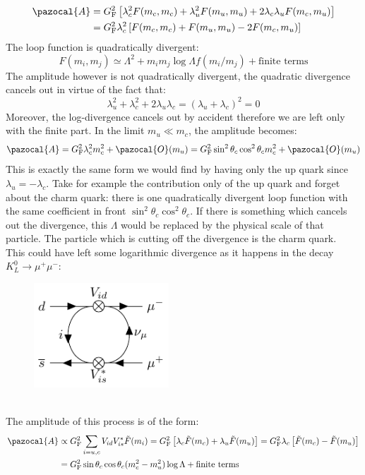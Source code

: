 \documentclass[../main.tex]{subfiles}
\begin{document}
\begin{align*}
\pazocal{A}&=G_{\text{F}}^2\left[\lambda_c^2F(m_c,m_c)+\lambda_u^2F(m_u,m_u)+2\lambda_c\lambda_uF(m_c,m_u)\right]\\
&=G_{\text{F}}^2\lambda_c^2\left[F(m_c,m_c)+F(m_u,m_u)-2F(m_c,m_u)\right]
\end{align*}
The loop function is quadratically divergent:
\[
F(m_i,m_j)\simeq\Lambda^2+m_im_j\log\Lambda f(m_i/m_j)+\text{finite terms}
\]
The amplitude however is not quadratically divergent, the quadratic divergence cancels out in virtue of the fact that:
\[
\lambda_u^2+\lambda_c^2+2\lambda_u\lambda_c=(\lambda_u+\lambda_c)^2=0
\]
Moreover, the log-divergence cancels out by accident therefore we are left only with the finite part. In the limit $m_u\ll m_c$, the amplitude becomes:
\[
\pazocal{A}=G_{\text{F}}^2\lambda_c^2m_c^2+\pazocal{O}(m_u)=G_{\text{F}}^2\sin^2\theta_c\cos^2\theta_cm_c^2+\pazocal{O}(m_u)
\]
This is exactly the same form we would find by having only the up quark since $\lambda_u=-\lambda_c$. Take for example the contribution  only of the up quark and forget about the charm quark: there is one quadratically divergent loop function with the same coefficient in front $\sin^2\theta_c\cos^2\theta_c$. If there is something which cancels out the divergence, this $\Lambda$ would be replaced by the physical scale of that particle. The particle which is cutting off the divergence is the charm quark.\\
This could have left some logarithmic divergence as it happens in the decay $K_L^0\to\mu^+\mu^-$:
\begin{figure}[h]
    \centering
    \includegraphics[width=0.45\textwidth]{Images/kmu.pdf}
    \caption*{}
\end{figure}\\
The amplitude of this process is of the form:
\begin{align*}
\pazocal{A}&\propto G_{\text{F}}^2\sum_{i=u,c}V_{id}V_{is}^*\Tilde{F}(m_i)=G_{\text{F}}^2\left[\lambda_c\Tilde{F}(m_c)+\lambda_u\Tilde{F}(m_u)\right]=G_{\text{F}}^2\lambda_c\left[\Tilde{F}(m_c)-\Tilde{F}(m_u)\right]\\
&=G_{\text{F}}^2\sin\theta_c\cos\theta_c(m_c^2-m_u^2)\log\Lambda+\text{finite terms}
\end{align*}
\end{document}
